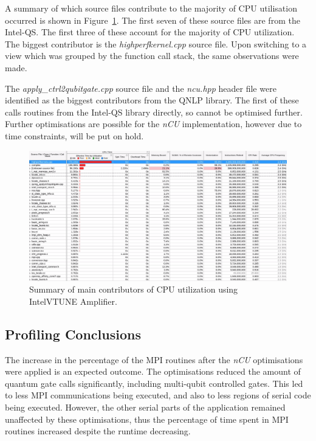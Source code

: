 A summary of which source files contribute to the majority of CPU utilisation occurred is shown in Figure~\ref{fig:vtume_amplxe_summary}. The first seven of these source files are from the Intel\textregistered-QS. The first three of these account for the majority of CPU utilization. The biggest contributor is the \textit{highperfkernel.cpp} source file. Upon switching to a view which was grouped by the function call stack, the same observations were made.

The \textit{apply\_ctrl2qubitgate.cpp} source file and the \textit{ncu.hpp} header file were identified as the biggest contributors from the QNLP library. The first of these calls routines from the Intel\textregistered-QS library directly, so cannot be optimised further. Further optimisations are possible for the \textit{nCU} implementation, however due to time constraints, will be put on hold.

\begin{figure}[H]%
    \centering
    \includegraphics[width=1.\linewidth]{Images/VTUNE_Amplxe/vtune_amplxe_summary.png}
	\caption{Summary of main contributors of CPU utilization using Intel\textregistered VTUNE Amplifier.}
    \label{fig:vtume_amplxe_summary}
\end{figure}

\subsection{Profiling Conclusions}

The increase in the percentage of the MPI routines after the \textit{nCU} optimisations were applied is an expected outcome. The optimisations reduced the amount of quantum gate calls significantly, including multi-qubit controlled gates. This led to less MPI communications being executed, and also to less regions of serial code being executed. However, the other serial parts of the application remained unaffected by these optimisations, thus the percentage of time spent in MPI routines increased despite the runtime decreasing.

